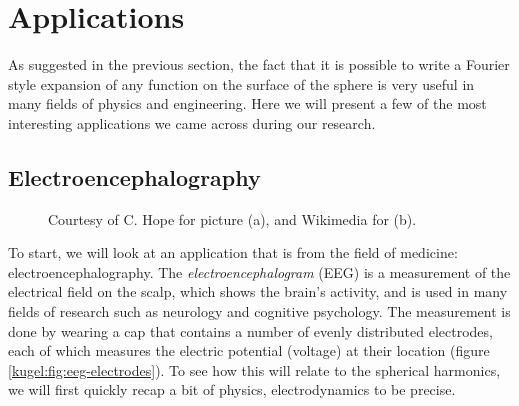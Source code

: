 
\section{Applications}

As suggested in the previous section, the fact that it is possible to write a
Fourier style expansion of any function on the surface of the sphere is very
useful in many fields of physics and engineering. Here we will present a few of
the most interesting applications we came across during our research.

\subsection{Electroencephalography}

\begin{figure}
  \centering
  \qquad
  \caption{
    Courtesy of C. Hope \cite{sheerman-chase_volunteer_2012} for picture (a),
    and Wikimedia \cite{maschen_english_2013} for (b).
    \label{kugel:fig:eeg}
  }
\end{figure}

To start, we will look at an application that is from the field of medicine:
electroencephalography. The \emph{electroencephalogram} (EEG) is a measurement
of the electrical field on the scalp, which shows the brain's activity, and is
used in many fields of research such as neurology and cognitive psychology.  The
measurement is done by wearing a cap that contains a number of evenly
distributed electrodes, each of which measures the electric potential (voltage)
at their location (figure \ref{kugel:fig:eeg-electrodes}).  To see how this will
relate to the spherical harmonics, we will first quickly recap a bit of physics,
electrodynamics to be precise.

